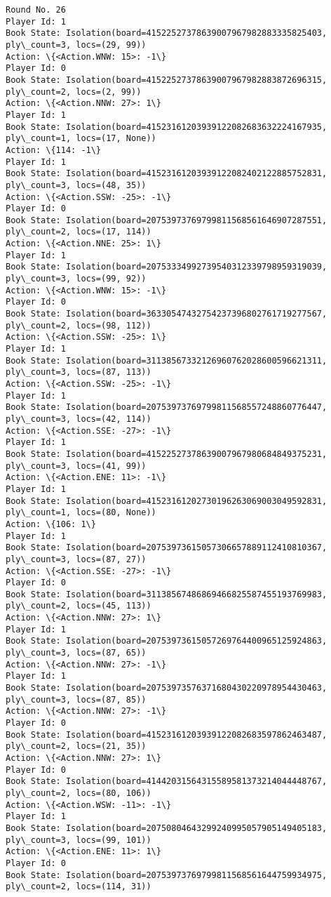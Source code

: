 \documentclass[11pt]{article}
\begin{document}
\begin{Verbatim}[commandchars=\\\{\}]
Round No. 26
Player Id: 1
Book State: Isolation(board=41522527378639007967982883335825403, ply\_count=3, locs=(29, 99))
Action: \{<Action.WNW: 15>: -1\}
Player Id: 0
Book State: Isolation(board=41522527378639007967982883872696315, ply\_count=2, locs=(2, 99))
Action: \{<Action.NNW: 27>: 1\}
Player Id: 1
Book State: Isolation(board=41523161203939122082683632224167935, ply\_count=1, locs=(17, None))
Action: \{114: -1\}
Player Id: 1
Book State: Isolation(board=41523161203939122082402122885752831, ply\_count=3, locs=(48, 35))
Action: \{<Action.SSW: -25>: -1\}
Player Id: 0
Book State: Isolation(board=20753973769799811568561646907287551, ply\_count=2, locs=(17, 114))
Action: \{<Action.NNE: 25>: 1\}
Player Id: 1
Book State: Isolation(board=20753334992739540312339798959319039, ply\_count=3, locs=(99, 92))
Action: \{<Action.WNW: 15>: -1\}
Player Id: 0
Book State: Isolation(board=36330547432754237396802761719277567, ply\_count=2, locs=(98, 112))
Action: \{<Action.SSW: -25>: 1\}
Player Id: 1
Book State: Isolation(board=31138567332126960762028600596621311, ply\_count=3, locs=(87, 113))
Action: \{<Action.SSW: -25>: -1\}
Player Id: 1
Book State: Isolation(board=20753973769799811568557248860776447, ply\_count=3, locs=(42, 114))
Action: \{<Action.SSE: -27>: -1\}
Player Id: 1
Book State: Isolation(board=41522527378639007967980684849375231, ply\_count=3, locs=(41, 99))
Action: \{<Action.ENE: 11>: -1\}
Player Id: 1
Book State: Isolation(board=41523161202730196263069003049592831, ply\_count=1, locs=(80, None))
Action: \{106: 1\}
Player Id: 1
Book State: Isolation(board=20753973615057306657889112410810367, ply\_count=3, locs=(87, 27))
Action: \{<Action.SSE: -27>: -1\}
Player Id: 0
Book State: Isolation(board=31138567486869466825587455193769983, ply\_count=2, locs=(45, 113))
Action: \{<Action.NNW: 27>: 1\}
Player Id: 1
Book State: Isolation(board=20753973615057269764400965125924863, ply\_count=3, locs=(87, 65))
Action: \{<Action.NNW: 27>: -1\}
Player Id: 1
Book State: Isolation(board=20753973576371680430220978954430463, ply\_count=3, locs=(87, 85))
Action: \{<Action.NNW: 27>: -1\}
Player Id: 0
Book State: Isolation(board=41523161203939122082683597862463487, ply\_count=2, locs=(21, 35))
Action: \{<Action.NNW: 27>: 1\}
Player Id: 0
Book State: Isolation(board=41442031564315589581373214044448767, ply\_count=2, locs=(80, 106))
Action: \{<Action.WSW: -11>: -1\}
Player Id: 1
Book State: Isolation(board=20750804643299240995057905149405183, ply\_count=3, locs=(99, 101))
Action: \{<Action.ENE: 11>: 1\}
Player Id: 0
Book State: Isolation(board=20753973769799811568561644759934975, ply\_count=2, locs=(114, 31))

\end{Verbatim}
\end{document}
